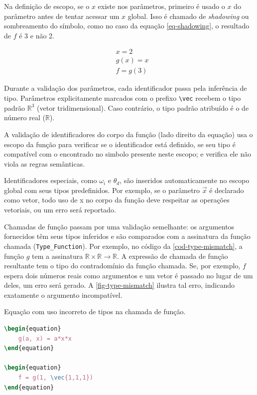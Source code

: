 Na definição de escopo, se o $x$ existe nos parâmetros, primeiro é usado o $x$ do parâmetro antes de tentar acessar um $x$ global. Isso é chamado de \textit{shadowing} ou sombreamento do símbolo, como no caso da equação \autoref{eq-shadowing}, o resultado de $f$ é 3 e não 2.

\begin{align} \label{eq-shadowing}
    &x = 2 \\
    &g(x) = x \\
    &f = g(3)
\end{align}


Durante a validação dos parâmetros, cada identificador passa pela inferência de tipo. Parâmetros explicitamente marcados com o prefixo \verb"\vec" recebem o tipo padrão $\mathbb{R}^3$ (vetor tridimensional). Caso contrário, o tipo padrão atribuído é o de número real ($\mathbb{R}$).

A validação de identificadores do corpo da função (lado direito da equação) usa o escopo da função para verificar se o identificador está definido, se seu tipo é compatível com o encontrado no simbolo presente neste escopo; e verifica ele não viola as regras semânticas.

Identificadores especiais, como $\omega_i$ e $\theta_d$, são inseridos automaticamente no escopo global com seus tipos predefinidos. Por exemplo, se o parâmetro $\vec{x}$ é declarado como vetor, todo uso de x no corpo da função deve respeitar as operações vetoriais, ou um erro será reportado.


Chamadas de função passam por uma validação semelhante: os argumentos fornecidos têm seus tipos inferidos e são comparados com a assinatura da função chamada (\verb"Type_Function"). Por exemplo, no código da \autoref{cod-type-mismatch}, a função $g$ tem a assinatura $\mathbb{R} \times \mathbb{R} \to \mathbb{R}$. A expressão de chamada de função resultante tem o tipo do contradomínio da função chamada. Se, por exemplo, $f$ espera dois números reais como argumentos e um vetor é passado no lugar de um deles, um erro será gerado. A \autoref{fig-type-mismatch} ilustra tal erro, indicando exatamente o argumento incompatível.

\begin{codigo}[htb]
    \caption{\small Equação com uso incorreto de tipos na chamada de função. }
    \label{cod-type-mismatch}
\begin{lstlisting}[language=tex, numbers=none, frame=none, inputencoding=latin1]
\begin{equation}
    g(a, x) = a*x*x
\end{equation}

\begin{equation}
    f = g(1, \vec{1,1,1})
\end{equation}

\end{lstlisting}
\end{codigo}

